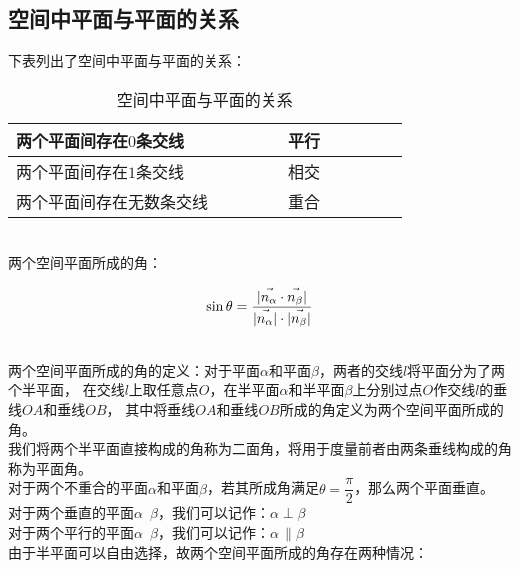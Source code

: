 \documentclass[UTF8]{ctexart}
\let\nvec\vec
\def\vec#1{\nvec{\vphantom b\smash{#1}}}
\begin{document}
\newpage

\subsection{空间中平面与平面的关系}
    下表列出了空间中平面与平面的关系：
    \begin{table}[h]
        \begin{center}
            \begin{tabular}{l|l}
                \hline
                两个平面间存在$0$条交线~~~~~~~~&平行~~~~~~~~\\ \hline
                两个平面间存在$1$条交线~~~~~~~~&相交~~~~~~~~\\ \hline
                两个平面间存在无数条交线~~~~~~~~&重合~~~~~~~~\\ \hline
            \end{tabular}
            \caption{空间中平面与平面的关系}
        \end{center}
    \end{table}\\
    两个空间平面所成的角：
    \begin{large}
        \begin{equation*}
            \sin{\theta}=\frac{|\vec{n_\alpha}\cdot\vec{n_\beta}|}{|\vec{n_\alpha}|\cdot|\vec{n_\beta}|}
        \end{equation*}
    \end{large}\\
    两个空间平面所成的角的定义：对于平面$\alpha$和平面$\beta$，两者的交线$l$将平面分为了两个半平面，
    在交线$l$上取任意点$O$，在半平面$\alpha$和半平面$\beta$上分别过点$O$作交线$l$的垂线$OA$和垂线$OB$，
    其中将垂线$OA$和垂线$OB$所成的角定义为两个空间平面所成的角。\\[3mm]
    我们将两个半平面直接构成的角称为二面角，将用于度量前者由两条垂线构成的角称为平面角。\\[3mm]
    对于两个不重合的平面$\alpha$和平面$\beta$，若其所成角满足$\theta=\dfrac{\pi}{2}$，那么两个平面垂直。\\[3mm]
    对于两个垂直的平面$\alpha$~$\beta$，我们可以记作：$\alpha\perp\beta$\\[3mm]
    对于两个平行的平面$\alpha$~$\beta$，我们可以记作：$\alpha\,\parallel\beta$\\[6mm]
    由于半平面可以自由选择，故两个空间平面所成的角存在两种情况：\vspace{5pt}
\end{document}
